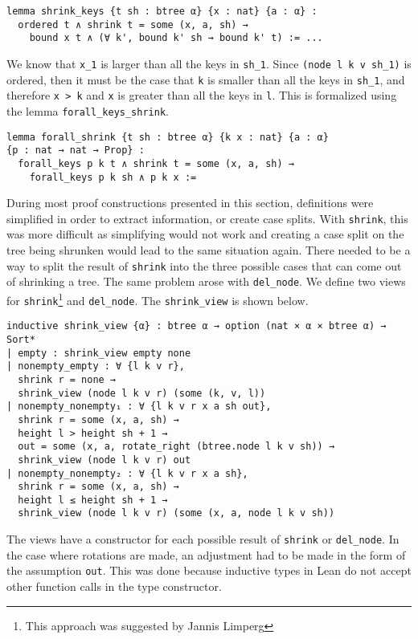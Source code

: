 \begin{lstlisting}
lemma shrink_keys {t sh : btree α} {x : nat} {a : α} :
  ordered t ∧ shrink t = some (x, a, sh) → 
    bound x t ∧ (∀ k', bound k' sh → bound k' t) := ...
\end{lstlisting}

We know that \lstinline{x_1} is larger than all the keys in \lstinline{sh_1}. Since \lstinline{(node l k v sh_1)} is ordered, then it must be the case that \lstinline{k} is smaller than all the keys in \lstinline{sh_1}, and therefore \lstinline{x > k} and \lstinline{x} is greater than all the keys in \lstinline{l}. This is formalized using the lemma \lstinline{forall_keys_shrink}.

\begin{lstlisting}
lemma forall_shrink {t sh : btree α} {k x : nat} {a : α} 
{p : nat → nat → Prop} :
  forall_keys p k t ∧ shrink t = some (x, a, sh) → 
    forall_keys p k sh ∧ p k x :=
\end{lstlisting}

During most proof constructions presented in this section, definitions were simplified in order to extract information, or create case splits. With \lstinline{shrink}, this was more difficult as simplifying would not work and creating a case split on the tree being shrunken would lead to the same situation again. There needed to be a way to split the result of \lstinline{shrink} into the three possible cases that can come out of shrinking a tree. The same problem arose with \lstinline{del_node}. We define two views for \lstinline{shrink}\footnote{This approach was suggested by Jannis Limperg} and \lstinline{del_node}. The \lstinline{shrink_view} is shown below.

\begin{lstlisting}
inductive shrink_view {α} : btree α → option (nat × α × btree α) → Sort*
| empty : shrink_view empty none
| nonempty_empty : ∀ {l k v r},
  shrink r = none →
  shrink_view (node l k v r) (some (k, v, l))
| nonempty_nonempty₁ : ∀ {l k v r x a sh out},
  shrink r = some (x, a, sh) →
  height l > height sh + 1 →
  out = some (x, a, rotate_right (btree.node l k v sh)) →
  shrink_view (node l k v r) out
| nonempty_nonempty₂ : ∀ {l k v r x a sh},
  shrink r = some (x, a, sh) →
  height l ≤ height sh + 1 →
  shrink_view (node l k v r) (some (x, a, node l k v sh))
\end{lstlisting}

The views have a constructor for each possible result of \lstinline{shrink} or \lstinline{del_node}. In the case where rotations are made, an adjustment had to be made in the form of the assumption \lstinline{out}. This was done because inductive types in Lean do not accept other function calls in the type constructor.

